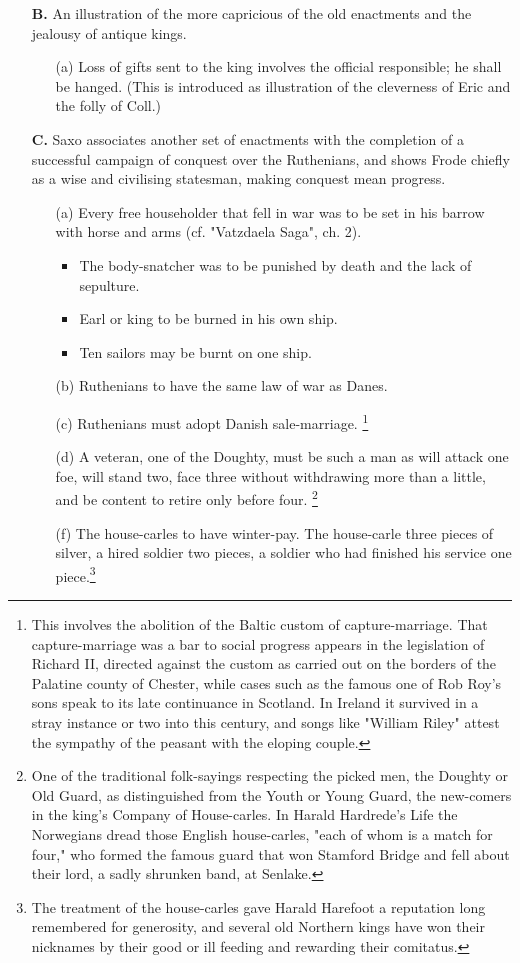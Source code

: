 \documentclass[10pt,a4paper]{report}
\begin{document}
\begin{itemize}
\item[\textbf{\large{B.}}] An illustration of the more capricious of the old enactments and the jealousy of antique kings.
\begin{itemize}
\item[(a)] Loss of gifts sent to the king involves the official responsible; he shall be hanged. (This is introduced as illustration of the cleverness of Eric and the folly of Coll.)
\end{itemize}

\item[\textbf{\large{C.}}] Saxo associates another set of enactments with the completion of a successful campaign of conquest over the Ruthenians, and shows Frode chiefly as a wise and civilising statesman, making conquest mean progress.
\begin{itemize}
\item[(a)] Every free householder that fell in war was to be set in his barrow with horse and arms (cf. "Vatzdaela Saga", ch. 2).
\begin{itemize}
\item The body-snatcher was to be punished by death and the lack of sepulture.
\item Earl or king to be burned in his own ship.
\item Ten sailors may be burnt on one ship.
\end{itemize}
\item[(b)] Ruthenians to have the same law of war as Danes.
\item[(c)] Ruthenians must adopt Danish sale-marriage. \footnote{This involves the abolition of the Baltic custom of capture-marriage. That capture-marriage was a bar to social progress appears in the legislation of Richard II, directed against the custom as carried out on the borders of the Palatine county of Chester, while cases such as the famous one of Rob Roy's sons speak to its late continuance in Scotland. In Ireland it survived in a stray instance or two into this century, and songs like "William Riley" attest the sympathy of the peasant with the eloping couple.}
\item[(d)] A veteran, one of the Doughty, must be such a man as will attack one foe, will stand two, face three without withdrawing more than a little, and be content to retire only before four. \footnote{One of the traditional folk-sayings respecting the picked men, the Doughty or Old Guard, as distinguished from the Youth or Young Guard, the new-comers in the king's Company of House-carles. In Harald Hardrede's Life the Norwegians dread those English house-carles, "each of whom is a match for four," who formed the famous guard that won Stamford Bridge and fell about their lord, a sadly shrunken band, at Senlake.}
\item[(f)] The house-carles to have winter-pay. The house-carle three pieces of silver, a hired soldier two pieces, a soldier who had finished his service one piece.\footnote{The treatment of the house-carles gave Harald Harefoot a reputation long remembered for generosity, and several old Northern kings have won their nicknames by their good or ill feeding and rewarding their comitatus.}
\end{itemize}


\end{itemize}
\end{document}
